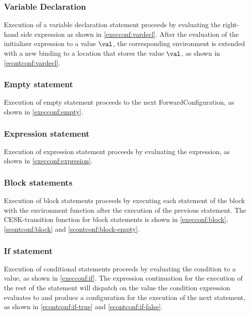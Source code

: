 \documentclass[a4paper,oneside]{article}
\begin{document}
\subsubsection{Variable Declaration}

Execution of a variable declaration statement proceeds by evaluating the right-hand side expression as shown in \eqref{execconf:vardecl}.
After the evaluation of the initializer expression to a value $\val$, the corresponding environment is extended with a new binding to a location that stores the value $\val$, as shown in \eqref{econtconf:vardecl}.


\subsubsection{Empty statement}
\label{subsubsec:emtpy-stmt}

Execution of empty statement proceeds to the next ForwardConfiguration, as shown in \eqref{execconf:empty}.


\subsubsection{Expression statement}
\label{expression-stmt}

Execution of expression statement proceeds by evaluating the expression, as shown in \eqref{execconf:expresion}.


\subsubsection{Block statements}

Execution of block statements proceeds by executing each statement of the block with the environment function after the execution of the previous statement.
The CESK-transition function for block statements is shown in \eqref{execconf:block}, \eqref{scontconf:block} and \eqref{scontconf:block-empty}.


\subsubsection{If statement}

Execution of conditional statements proceeds by evaluating the condition to a value, as shown in \eqref{execconf:if}.
The expression continuation for the execution of the rest of the statement will dispatch on the value the condition expression evaluates to and produce a configuration for the execution of the next statement, as shown in \eqref{econtconf:if-true} and \eqref{econtconf:if-false}.
\end{document}
